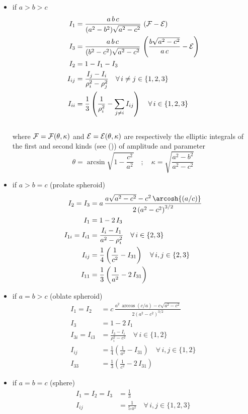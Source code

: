 \documentclass[
  letterpaper,
  DIV=11,
  numbers=noendperiod]{scrreprt}
\providecommand{\tightlist}{%
  \setlength{\itemsep}{0pt}\setlength{\parskip}{0pt}}\usepackage{longtable,booktabs,array}
\begin{document}
\begin{itemize}
\tightlist
\item
  if \(a > b > c\) \[\begin{aligned}
    I_1&=\frac{a\,b\,c}{(a^2-b^2)\sqrt{a^2-c^2}}\,
    \left({\cal F}-{\cal E}\right)\\
    I_3&=\frac{a\,b\,c}{(b^2-c^2)\sqrt{a^2-c^2}}\,
    \left(\frac{b\sqrt{a^2-c^2}}{a\,c}-
    {\cal E}\right)\\
    I_2&=1-I_1-I_3\\
    I_{ij}&=\frac{I_j-I_i}{\rho_i^2-\rho_j^2}\quad\forall\, i\neq j\in\{1,2,3\}\\
    I_{ii}&=\frac{1}{3}\left(
    \frac{1}{\rho_i^2}-
    \sum_{j\neq i}I_{ij} \right) 
    \quad\forall\, i\in\{1,2,3\}
    \end{aligned}\]\\
  where \({\cal F}={\cal F}(\theta,\kappa)\) and
  \({\cal E}={\cal E}(\theta,\kappa)\) are respectively the elliptic
  integrals of the first and second kinds (see
  ()) of
  amplitude and parameter \[
    \theta=\arcsin{\sqrt{1-\frac{c^2}{a^2}}}
    \quad;\quad
    \kappa=\sqrt{\frac{a^2-b^2}{a^2-c^2}}
    \]
\item
  if \(a > b = c\) (prolate spheroid) \[\begin{aligned}
    I_2=I_3&=a\,
    \frac{a\sqrt{a^2-c^2}-c^2\,\arcosh{(a/c)}}
    {2\left(a^2-c^2\right)^{3/2}}\\
    I_1&=1-2\,I_3\\
    I_{1i}=I_{i1}&=\frac{I_i-I_1}{a^2-\rho_i^2}\quad
    \forall\, i\in\{2,3\}\\
    I_{ij}&=\frac{1}{4}
    \left(\frac{1}{c^2}-I_{31} \right) 
    \quad\forall\, i,j\in\{2,3\}\\
    I_{11}&=\frac{1}{3}
    \left(\frac{1}{a^2}-2\,I_{31} \right)
    \end{aligned}\]
\item
  if \(a = b > c\) (oblate spheroid) \[\begin{aligned}
    I_1=I_2&=c\,
    \frac{a^2\,\arccos{(c/a)}-c\sqrt{a^2-c^2}}
    {2\left(a^2-c^2\right)^{3/2}}\\
    I_3&=1-2\,I_1\\
    I_{3i}=I_{i3}&=\frac{I_3-I_i}{\rho_i^2-c^2}\quad
    \forall\, i\in\{1,2\}\\
    I_{ij}&=\frac{1}{4}
    \left(\frac{1}{a^2}-I_{31} \right) 
    \quad\forall\, i,j\in\{1,2\}\\
    I_{33}&=\frac{1}{3}
    \left(\frac{1}{c^2}-2\,I_{31} \right)
    \end{aligned}\]
\item
  if \(a = b = c\) (sphere) \[\begin{aligned}
    I_1=I_2=I_3&=\frac{1}{3}\\
    I_{ij}&=\frac{1}{5\,a^2}\quad\forall\, i,j\in\{1,2,3\}
    \end{aligned}\]
\end{itemize}
\end{document}
